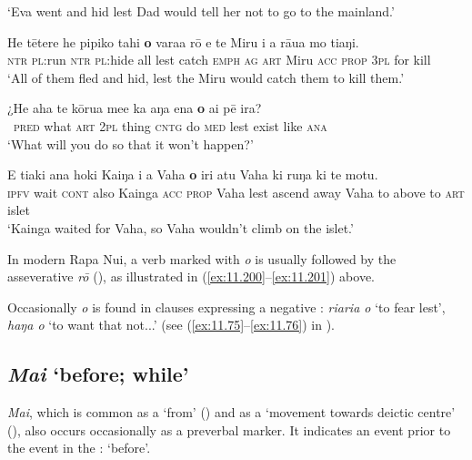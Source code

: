 \glt 
‘Eva went and hid lest Dad would tell her not to go to the mainland.’ \textstyleExampleref{[R210.026]} 
\z

\ea\label{ex:11.201}
\gll He tētere he pipiko tahi \textbf{{\ꞌ}o} vara{\ꞌ}a rō e te Miru i a rāua mo tiaŋi. \\
\textsc{ntr} \textsc{pl}:run \textsc{ntr} \textsc{pl}:hide all lest catch \textsc{emph} \textsc{ag} \textsc{art} Miru \textsc{acc} \textsc{prop} \textsc{3pl} for kill \\

\glt 
‘All of them fled and hid, lest the Miru would catch them to kill them.’ \textstyleExampleref{[R304.039]} 
\z

\ea\label{ex:11.202}
\gll ¿He aha te kōrua me{\ꞌ}e ka aŋa ena \textbf{{\ꞌ}o} ai pē ira? \\
~\textsc{pred} what \textsc{art} \textsc{2pl} thing \textsc{cntg} do \textsc{med} lest exist like \textsc{ana} \\

\glt 
‘What will you do so that it won’t happen?’ \textstyleExampleref{[R648.239]} 
\z

\ea\label{ex:11.203}
\gll E tiaki {\ꞌ}ana hoki Kaiŋa i a Vaha \textbf{{\ꞌ}o} iri atu Vaha  ki ruŋa ki te motu.\\
\textsc{ipfv} wait \textsc{cont} also Kainga \textsc{acc} \textsc{prop} Vaha lest ascend away Vaha  to above to \textsc{art} islet\\

\glt
‘Kainga waited for Vaha, so Vaha wouldn’t climb on the islet.’ \textstyleExampleref{[Mtx-3-01.124]}
\z

In modern Rapa Nui, a verb marked with \textit{{\ꞌ}o} is usually followed by the asseverative  \textit{rō} (), as illustrated in (\ref{ex:11.200}–\ref{ex:11.201}) above.

Occasionally \textit{{\ꞌ}o} is found in  clauses expressing a negative : \textit{\mbox{ri{\ꞌ}ari{\ꞌ}a} {\ꞌ}o} ‘to fear lest’, \textit{haŋa {\ꞌ}o} ‘to want that not...’ (see (\ref{ex:11.75}–\ref{ex:11.76}) in ). 

\subsection{\textit{Mai} ‘before; while’}\label{sec:11.5.5}
\textit{Mai}, which is common as a  ‘from’ () and as a  ‘movement towards deictic centre’ (), also occurs occasionally as a preverbal marker. It indicates an event prior to the event in the : ‘before’.

